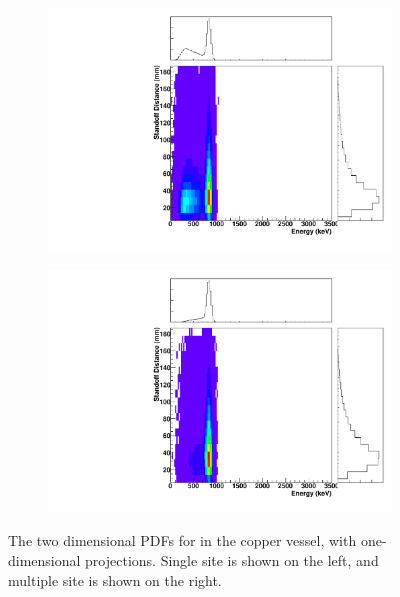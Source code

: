 \documentclass[herrin-thesis.tex]{subfiles}
\begin{document}
\begin{figure}[hp]
\centering
	\begin{subfigure}[b]{0.35\textwidth}
	\centering
	\includegraphics[width=\textwidth]{./plots/PDFs/analysis_pdf_AllVessel_Mn54_ss.pdf}
\end{subfigure}\hspace{0.1\textwidth}%
\begin{subfigure}[b]{0.35\textwidth}
	\centering
	\includegraphics[width=1\textwidth]{./plots/PDFs/analysis_pdf_AllVessel_Mn54_ms.pdf}
	\end{subfigure}
\caption[PDF for  in the TPC vessel]{The two dimensional PDFs for  in the copper vessel, with one-dimensional projections. Single site is shown on the left, and multiple site is shown on the right.}
\label{fig:analysis_pdf_AllVessel_Mn54}
\end{figure}
\end{document}

